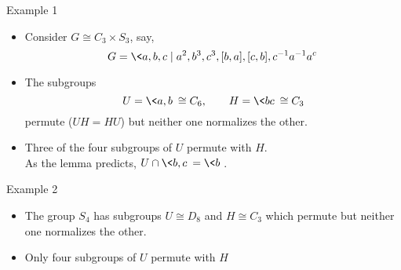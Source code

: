 \begin{frame}[fragile,label=ExampleOfPermutingIso,shrink=5]{Example 1}

  \begin{itemize}
  \item<1-> Consider $G\cong C_3 \times S_3$, say,
    \[G = \<a,b,c \mid a^2, b^3, c^3, [b,a], [c,b], c^{-1}a^{-1}a^c\>\]
\item<2->The subgroups 
\[U = \<a,b\> \cong C_6, \qquad H = \<bc\>\cong C_3\]
permute ($UH = HU$) but neither one normalizes the other.
  \end{itemize}
\vskip4mm
  \begin{itemize}
  \item<4-> Three of the four subgroups of $U$ permute with $H$.
\\[4pt] As the lemma predicts, $U\cap \<b, c\> = \<b\>$.
  \end{itemize}
\end{frame}


\begin{frame}[fragile,label=ExampleOfPermutingIso,shrink=5]{Example 2}

  \begin{itemize}
  \item<1-> The group $S_4$ has subgroups $U\cong D_8$ and $H\cong C_3$ which 
    permute but neither one normalizes the other.
  \end{itemize}
\vskip4mm
\begin{itemize}
\item<2-> Only four subgroups of $U$ permute with $H$%
\end{itemize}
\end{frame}


